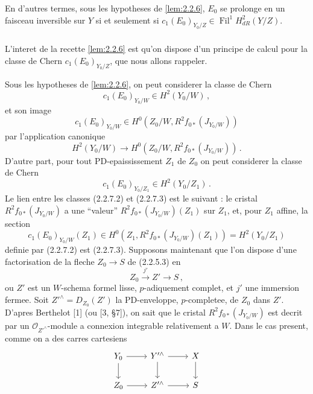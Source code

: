\documentclass[12pt,a4paper]{article}
\theoremstyle{plain}
\theoremstyle{definition}
\theoremstyle{remark}
\DeclareMathOperator{\Fil}{Fil}
\begin{document}
En d'autres termes, sous les hypotheses de \ref{lem:2.2.6}, $E_0$ se prolonge en un faisceau inversible sur $Y$ si et seulement si $c_1(E_0)_{Y_0/Z} \in \Fil^1H_{dR}^2(Y/Z)$.

\subsubsection{}

L'interet de la recette \ref{lem:2.2.6} est qu'on dispose d'un principe de calcul pour la classe de Chern $c_1(E_0)_{Y_0/Z}$, que nous allons rappeler.

Sous les hypotheses de \ref{lem:2.2.6}, on peut considerer la classe de Chern
\begin{equation}\label{eq:2.2.7.1}
c_1(E_0)_{Y_0/W} \in H^2(Y_0/W)\,,\end{equation}
et son image
\begin{equation}\label{eq:2.2.7.2}
c_1(E_0)_{Y_0/W} \in H^0(Z_0/W, R^2f_{0*}(J_{Y_0/W}))
\end{equation}
par l'application canonique
\[
H^2(Y_0/W) \longrightarrow H^0(Z_0/W, R^2f_{0*}(J_{Y_0/W}))\,.\]
D'autre part, pour tout PD-epaississement $Z_1$ de $Z_0$ on peut considerer la classe de Chern
\begin{equation}\label{eq:2.2.7.3}
c_1(E_0)_{Y_0/Z_1} \in H^2(Y_0/Z_1)\,.\end{equation}
Le lien entre les classes (2.2.7.2) et (2.2.7.3) est le suivant : le cristal $R^2f_{0*}(J_{Y_0/W})$ a une ``valeur'' $R^2f_{0*}(J_{Y_0/W})(Z_1)$ sur $Z_1$, et, pour $Z_1$ affine, la section
\[
c_1(E_0)_{Y_0/W}(Z_1) \in H^0(Z_1, R^2f_{0*}(J_{Y_0/W})(Z_1)) = H^2(Y_0/Z_1)
\]
definie par (2.2.7.2) est (2.2.7.3). Supposons maintenant que l'on dispose d'une factorisation de la fleche $Z_0 \to S$ de (2.2.5.3) en
\begin{equation}\label{eq:2.2.7.4}
Z_0 \xrightarrow{j'} Z' \longrightarrow S\,,
\end{equation}
ou $Z'$ est un $W$-schema formel lisse, $p$-adiquement complet, et $j'$ une immersion fermee. Soit $Z'^\wedge = D_{Z_0}(Z')$ la PD-enveloppe, $p$-completee, de $Z_0$ dans $Z'$. D'apres Berthelot [1] (ou [3, \S 7]), on sait que le cristal $R^2f_{0*}(J_{Y_0/W})$ est decrit par un $\mathcal{O}_{Z'^\wedge}$-module a connexion integrable relativement a $W$. Dans le cas present, comme on a des carres cartesiens
\begin{equation}\label{eq:2.2.7.5}
\begin{tikzcd}
Y_0 \rar \dar & Y'^\wedge \rar \dar & X \dar \\
Z_0 \rar & Z'^\wedge \rar & S
\end{tikzcd}
\end{equation}
\end{document}
